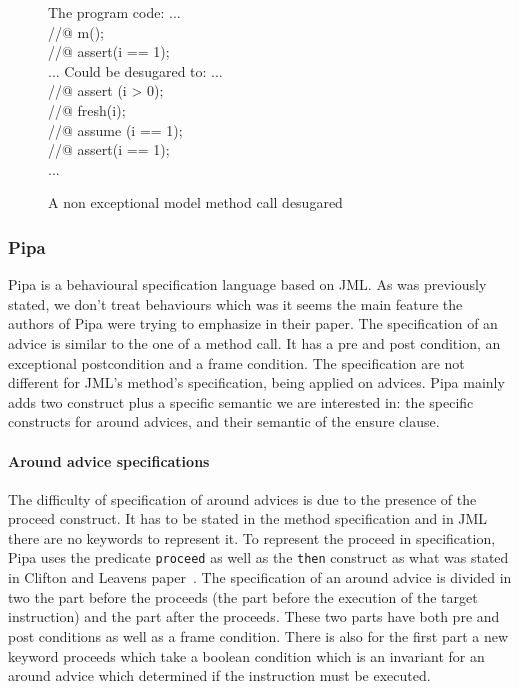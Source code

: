 \documentclass[draft]{llncs}
\begin{document}
\begin{figure}
\begin{center}\begin{minipage}{4cm}
The program code:
\bcode
...\\
//@ m();\\
//@ assert(i == 1);\\
...
\ecode
Could be desugared to:
\bcode
...\\
//@ assert (i > 0);\\
//@ fresh(i);\\
//@ assume (i == 1);\\
//@ assert(i == 1);\\
...
\ecode
\end{minipage}\end{center}
\caption{A non exceptional model method call desugared}
\label{model_meth}
\end{figure}
\subsubsection{Pipa}
Pipa is a behavioural specification language based on JML. As was previously stated, we don't treat behaviours 
which was it seems the main feature the authors of Pipa were trying to emphasize in their paper.
The specification of an advice is similar to the one of a method call. It has a pre and post condition,
an exceptional postcondition and a frame condition. The specification are not different for JML's method's 
specification, being applied on advices.
Pipa mainly adds two construct plus a specific semantic we are interested in:
the specific constructs for around advices, and their semantic of the ensure clause.

\paragraph{Around advice specifications} The difficulty of specification of around advices is due to the presence
of the proceed construct. It has to be stated in the method specification and in JML there are no keywords to
represent it. To represent the proceed in specification, Pipa uses the predicate {\tt proceed}
as well as the {\tt then} construct as what was stated in Clifton and Leavens paper~\cite{clifton02spectators}.
The specification of an around advice is divided in two the part before the proceeds (the part before the 
execution of the target instruction) and the part after the proceeds. These two parts have both pre and post 
conditions as well as a frame condition. There is also for the first part a new keyword proceeds which take a 
boolean condition which is an invariant for an around advice which determined if the instruction must be executed.
\end{document}
